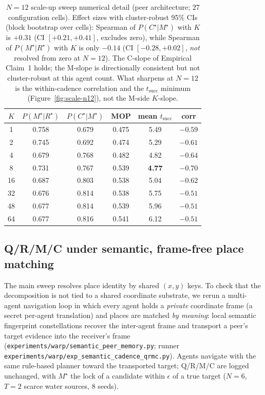 \documentclass{article}
\newcommand{\method}[1]{\texttt{#1}}
\begin{document}
\begin{table}[h]
\caption{$N\!=\!12$ scale-up sweep numerical detail (peer architecture; $27$ configuration cells). Effect sizes with cluster-robust 95\% CIs (block bootstrap over cells): Spearman of $P(C^\star|M^\star)$ with $K$ is $+0.31$ (CI $[+0.21,+0.41]$, excludes zero), while Spearman of $P(M^\star|R^\star)$ with $K$ is only $-0.14$ (CI $[-0.28,+0.02]$, \emph{not} resolved from zero at $N{=}12$). The C-slope of Empirical Claim~1 holds; the M-slope is directionally consistent but not cluster-robust at this agent count. What sharpens at $N{=}12$ is the within-cadence correlation and the $t_{\mathrm{succ}}$ minimum (Figure~\ref{fig:scale-n12}), not the M-side $K$-slope.}
\label{tab:scale-n12}
\centering
\small
\begin{tabular}{c c c c c c}
\toprule
$K$ & $P(M^\star|R^\star)$ & $P(C^\star|M^\star)$ & MOP & mean $t_{\mathrm{succ}}$ & corr \\
\midrule
1  & 0.758 & 0.679 & 0.475 & 5.49 & $-0.59$ \\
2  & 0.745 & 0.692 & 0.474 & 5.29 & $-0.61$ \\
4  & 0.679 & 0.768 & 0.482 & 4.82 & $-0.64$ \\
8  & 0.731 & 0.767 & 0.539 & \textbf{4.77} & $\mathbf{-0.70}$ \\
16 & 0.687 & 0.803 & 0.538 & 5.04 & $-0.62$ \\
32 & 0.676 & 0.814 & 0.538 & 5.75 & $-0.51$ \\
48 & 0.677 & 0.814 & 0.539 & 5.96 & $-0.51$ \\
64 & 0.677 & 0.816 & 0.541 & 6.12 & $-0.51$ \\
\bottomrule
\end{tabular}
\end{table}

\subsection{Q/R/M/C under semantic, frame-free place matching}
\label{app:semantic-matching}

The main sweep resolves place identity by shared $(x,y)$ keys. To check that
the decomposition is not tied to a shared coordinate substrate, we rerun a
multi-agent navigation loop in which every agent holds a \emph{private}
coordinate frame (a secret per-agent translation) and places are matched
\emph{by meaning}: local semantic fingerprint constellations recover the
inter-agent frame and transport a peer's target evidence into the receiver's
frame (\method{experiments/warp/semantic\_peer\_memory.py}; runner
\method{experiments/warp/exp\_semantic\_cadence\_qrmc.py}). Agents navigate with
the same rule-based planner toward the transported target; Q/R/M/C are logged
unchanged, with $M^\star$ the lock of a candidate within $\epsilon$ of a true
target ($N{=}6$, $T{=}2$ scarce water sources, $8$ seeds).
\end{document}
